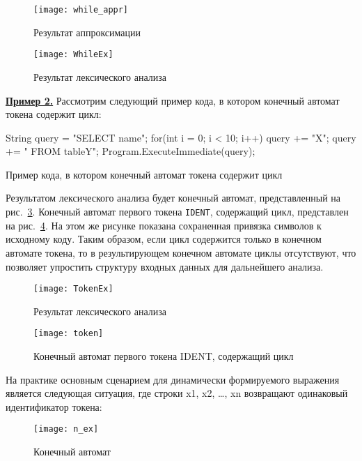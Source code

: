 \documentclass[10pt, conference, compsocconf]{IEEEtran}
\begin{document}
\begin{figure}[h]
\centering
\texttt{[image: while\_appr]}
\caption{Результат аппроксимации}
\label{fig:while_appr}
\end{figure}


\begin{figure}[h]
\centering
\texttt{[image: WhileEx]}
\caption{Результат лексического анализа}
\label{fig:while_lex}
\end{figure}

\textbf{\underline{Пример 2.}}
Рассмотрим следующий пример кода, в котором конечный автомат токена содержит цикл:
\begin{listing}[H]
\begin{pyglist}[language=csharp,numbers=none,numbersep=5pt]
String query = "SELECT name";
for(int i = 0; i < 10; i++){
   query  += "X";
}
query += " FROM tableY";
Program.ExecuteImmediate(query);
\end{pyglist}
\caption{Пример кода, в котором конечный автомат токена содержит цикл}
\label{lst:exampleFor}
\end{listing}

Результатом лексического анализа будет конечный автомат, представленный на рис.~\ref{fig:token_ex}. Конечный автомат первого токена \verb|IDENT|, содержащий цикл, представлен на рис.~\ref{fig:token_lex}. На этом же рисунке показана сохраненная привязка символов к исходному коду. Таким образом, если цикл содержится только в конечном автомате токена, то в результирующем конечном автомате циклы отсутствуют, что позволяет упростить структуру входных данных для дальнейшего анализа.

\begin{figure}[h]
\centering
\texttt{[image: TokenEx]}
\caption{Результат лексического анализа}
\label{fig:token_ex}
\end{figure}

\begin{figure}[h]
\centering
\texttt{[image: token]}
\caption{Конечный автомат первого токена IDENT, содержащий цикл}
\label{fig:token_lex}
\end{figure}

На практике основным сценарием для динамически формируемого выражения является следующая ситуация, где строки x1, x2, \ldots, xn возвращают одинаковый идентификатор токена:

\begin{figure}[h]
\centering
\texttt{[image: n\_ex]}
\caption{Конечный автомат}
\label{fig:fsa_n}
\end{figure}
\end{document}
